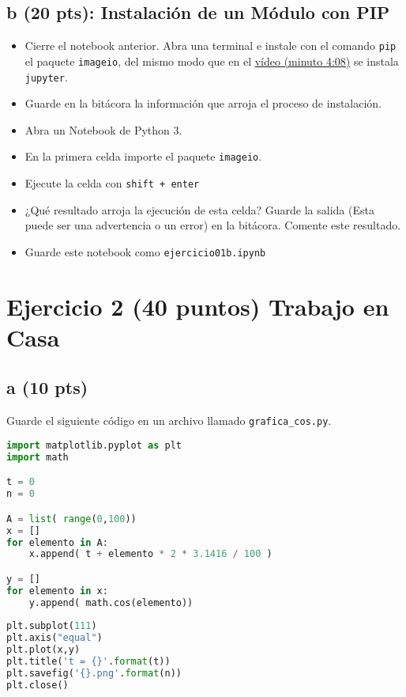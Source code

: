 \documentclass{article}
\begin{document}
\subsection*{b (20 pts): Instalación de un Módulo con PIP}
\begin{itemize}
    \item Cierre el notebook anterior. Abra una terminal e instale con el comando \texttt{pip} el paquete \texttt{imageio}, del mismo modo que en el \href{https://www.youtube.com/watch?v=IpyG-1Ied3w&list=PLHQtzvthdVM_MGC9dPFKe4hPAwBd_7RJ3&index=10&t=248s}{vídeo (minuto 4:08)} se instala \texttt{jupyter}. 
    \item Guarde en la bitácora la información que arroja el proceso de instalación.
    \item Abra un Notebook de Python 3.
    \item En la primera celda importe el paquete \texttt{imageio}.
    \item Ejecute la celda con \texttt{shift + enter}
    \item ¿Qué resultado arroja la ejecución de esta celda? Guarde la salida (Esta puede ser una advertencia o un error) en la bitácora. Comente este resultado.
    \item Guarde este notebook como \texttt{ejercicio01b.ipynb}
\end{itemize}

\section*{Ejercicio 2 (40 puntos) Trabajo en Casa}

\subsection*{a (10 pts)}
Guarde el siguiente código en un archivo llamado \texttt{grafica\_cos.py}.

\begin{lstlisting}[language=Python, caption=grafica-cos.py]
import matplotlib.pyplot as plt
import math

t = 0
n = 0

A = list( range(0,100))
x = []
for elemento in A:
    x.append( t + elemento * 2 * 3.1416 / 100 )

y = []
for elemento in x:
    y.append( math.cos(elemento))
    
plt.subplot(111)
plt.axis("equal")
plt.plot(x,y)    
plt.title('t = {}'.format(t))
plt.savefig('{}.png'.format(n))
plt.close()
\end{lstlisting}
\end{document}
